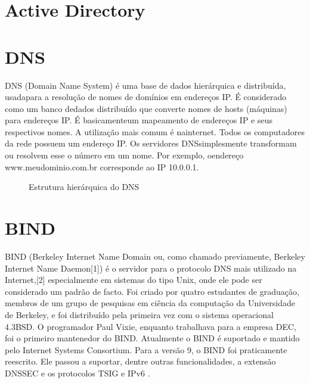 \section{Active Directory}

\section{DNS}

DNS (Domain Name System) é uma base de dados hierárquica e distribuída, usadapara a resolução de nomes de domínios em endereços IP. É considerado como um banco dedados distribuído que converte nomes de hosts (máquinas) para endereços IP. É basicamenteum mapeamento de endereços IP e seus respectivos nomes. A utilização mais comum é nainternet. Todos os computadores da rede possuem um endereço IP. Os servidores DNSsimplesmente transformam ou resolvem esse o número em um nome. Por exemplo, oendereço www.meudominio.com.br corresponde ao IP 10.0.0.1. \cite{SCRIMER}

\begin{figure}[ht]
   	\centering
   	\caption{Estrutura hierárquica do DNS \cite{SCRIMER}}
    \label{dns}
\end{figure}

\section{BIND}


BIND (Berkeley Internet Name Domain ou, como chamado previamente, Berkeley Internet Name Daemon[1]) é o servidor para o protocolo DNS mais utilizado na Internet,[2] especialmente em sistemas do tipo Unix, onde ele pode ser considerado um padrão de facto. Foi criado por quatro estudantes de graduação, membros de um grupo de pesquisas em ciência da computação da Universidade de Berkeley, e foi distribuído pela primeira vez com o sistema operacional 4.3BSD. O programador Paul Vixie, enquanto trabalhava para a empresa DEC, foi o primeiro mantenedor do BIND. Atualmente o BIND é suportado e mantido pelo Internet Systems Consortium.
Para a versão 9, o BIND foi praticamente reescrito. Ele passou a suportar, dentre outras funcionalidades, a extensão DNSSEC e os protocolos TSIG e IPv6 \cite{BIND}.

